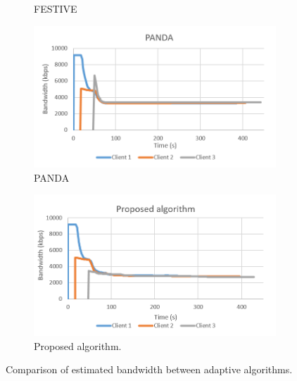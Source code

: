 \documentclass[journal]{IEEEtran}
\begin{document}
\begin{figure}[!h]
\begin{subfigure}[t]{0.3\textwidth}
         \caption{FESTIVE}
         \label{Bw FESTIVE}
     \end{subfigure}
     \begin{subfigure}[t]{0.3\textwidth}
         \centering
         \includegraphics[width=\textwidth]{images/PANDA.PNG}
         \caption{PANDA}
         \label{Bw PANDA}
     \end{subfigure}
	\begin{subfigure}[t]{0.3\textwidth}
         \centering
         \includegraphics[width=\textwidth]{images/Proposed.png}
         \caption{Proposed algorithm.}
         \label{Bw Pro}
     \end{subfigure}
	
	\caption{Comparison of estimated bandwidth between adaptive algorithms.}
	\label {Bandwidth comp}
	
\end{figure} 
\end{document}
